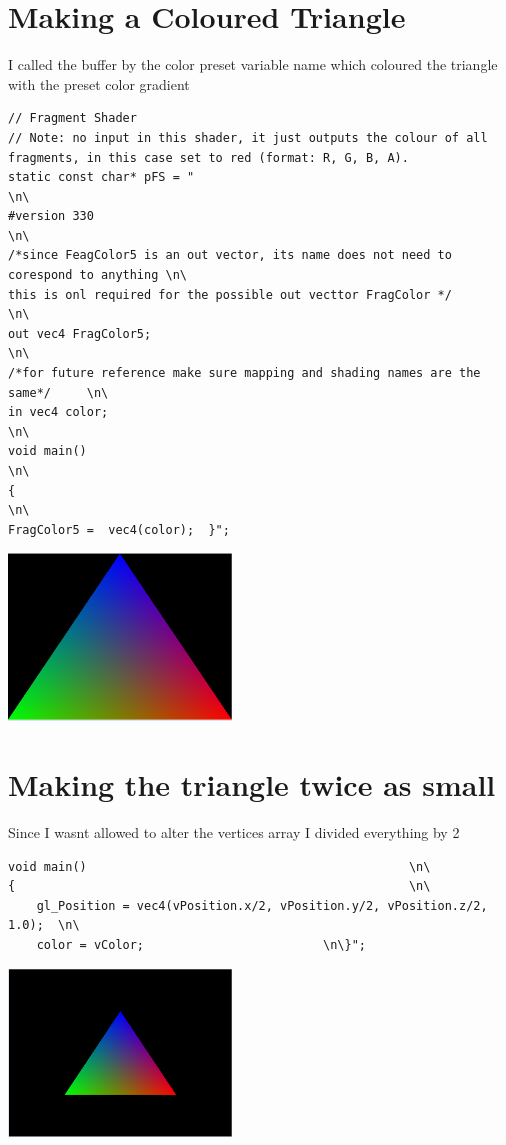 \documentclass{article}
\begin{document}
\section{Making a Coloured Triangle}
I called the buffer by the color preset variable name which coloured the triangle with the preset color gradient
\begin{lstlisting}
// Fragment Shader
// Note: no input in this shader, it just outputs the colour of all fragments, in this case set to red (format: R, G, B, A).
static const char* pFS = "                                              \n\
#version 330                                                            \n\
/*since FeagColor5 is an out vector, its name does not need to corespond to anything \n\
this is onl required for the possible out vecttor FragColor	*/		 \n\
out vec4 FragColor5;                                                      \n\
/*for future reference make sure mapping and shading names are the same*/     \n\
in vec4 color;																\n\
void main()                                                               \n\
{                                                                          \n\
FragColor5 =  vec4(color);	}";
\end{lstlisting}
\includegraphics[height=1.75in]{triangle.PNG}


\section{Making the triangle twice as small}
Since I wasnt allowed to alter the vertices array I divided everything by 2
\begin{lstlisting}
void main()                                             \n\
{                                                       \n\
    gl_Position = vec4(vPosition.x/2, vPosition.y/2, vPosition.z/2, 1.0);  \n\
	color = vColor;							\n\}";
\end{lstlisting}
\includegraphics[height=1.75in]{triangle_5.PNG}
\pagebreak
\end{document}
